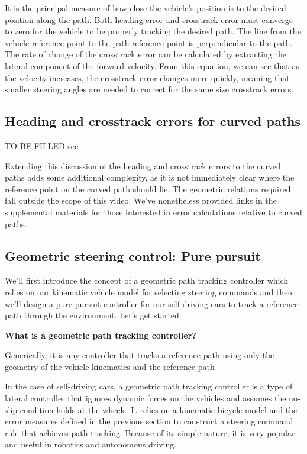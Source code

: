 It is the principal
measure of how close the vehicle's position is to
the desired position along the path. Both heading error and crosstrack
error must converge to zero for the vehicle to be properly
tracking the desired path. The line from the vehicle
reference point to the path reference point is
perpendicular to the path. The rate of change of the
crosstrack error can be calculated by extracting the lateral component
of the forward velocity. From this equation, we can see
that as the velocity increases, the crosstrack error
changes more quickly, meaning that smaller steering
angles are needed to correct for the same size
crosstrack errors. 

\subsection{Heading and crosstrack errors for curved paths}
TO BE FILLED see \cite{WangH2002}


Extending this discussion
of the heading and crosstrack errors to the curved paths adds some additional complexity, as it is not immediately clear where the reference point on
the curved path should lie. The geometric relations required fall outside the scope of this video. We've nonetheless provided links
in the supplemental materials for those interested in error calculations relative to curved paths. 

\subsection{Geometric steering control: Pure pursuit}
\label{geometric_steering_control_pure_pursuit}

We'll first introduce the concept of a geometric path tracking controller which relies on our kinematic vehicle model for selecting steering commands and then we'll design a pure pursuit controller for our self-driving cars to track a reference path through the environment. Let's get started. 

\begin{framed}
\theoremstyle{remark}
\begin{remark}{\textbf{What is a geometric path tracking controller?}}

Generically, it is any controller that tracks a reference path using only the geometry of the vehicle kinematics and the reference path
\end{remark}
\end{framed}

In the case of self-driving cars, a geometric path tracking controller is a type of lateral controller that ignores 
dynamic forces on the vehicles and assumes the no-slip condition holds at the wheels. 
It relies on a kinematic bicycle model and the error measures defined in the previous section to construct a steering command rule that achieves path tracking. 
Because of its simple nature, it is very popular and useful in robotics and autonomous driving. 

